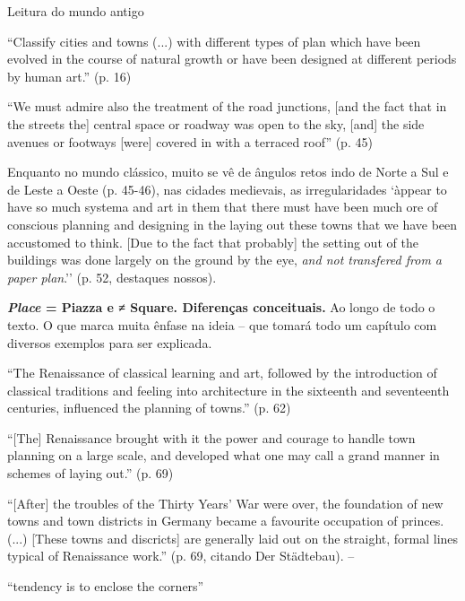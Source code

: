 \documentclass[12pt, a4paper]{book} %
\begin{document}
        Leitura do mundo antigo

        ``Classify cities and towns (...) with different types of plan which have been evolved in the course of natural growth or have been designed at different periods by human art.'' (p. 16)

        ``We must admire also the treatment of the road junctions, [and the fact that in the streets the] central space or roadway was open to the sky, [and] the side avenues or footways [were] covered in with a terraced roof'' (p. 45)

        Enquanto no mundo clássico, muito se vê de ângulos retos indo de Norte a Sul e de Leste a Oeste (p. 45-46), nas cidades medievais, as irregularidades `àppear to have so much systema and art in them that there must have been much ore of conscious planning and designing in the laying out these towns that we have been accustomed to think. [Due to the fact that probably] the setting out of the buildings was done largely on the ground by the eye, \textit{and not transfered from a paper plan}.'' (p. 52, destaques nossos).

        \textbf{\textit{Place} = Piazza e ≠ Square. Diferenças conceituais.} Ao longo de todo o texto. O que marca muita ênfase na ideia – que tomará todo um capítulo com diversos exemplos para ser explicada. 

        ``The Renaissance of classical learning and art, followed by the introduction of classical traditions and feeling into architecture in the sixteenth and seventeenth centuries, influenced the planning of towns.'' (p. 62)

        ``[The] Renaissance brought with it the power and courage to handle town planning on a large scale, and developed what one may call a grand manner in schemes of laying out.'' (p. 69)

        ``[After] the troubles of the Thirty Years' War were over, the foundation of new towns and town districts in Germany became a favourite occupation of princes. (...) [These towns and discricts] are generally laid out on the straight, formal lines typical of Renaissance work.'' (p. 69, citando Der Städtebau). – %

        ``tendency is to enclose the corners''
\end{document}
